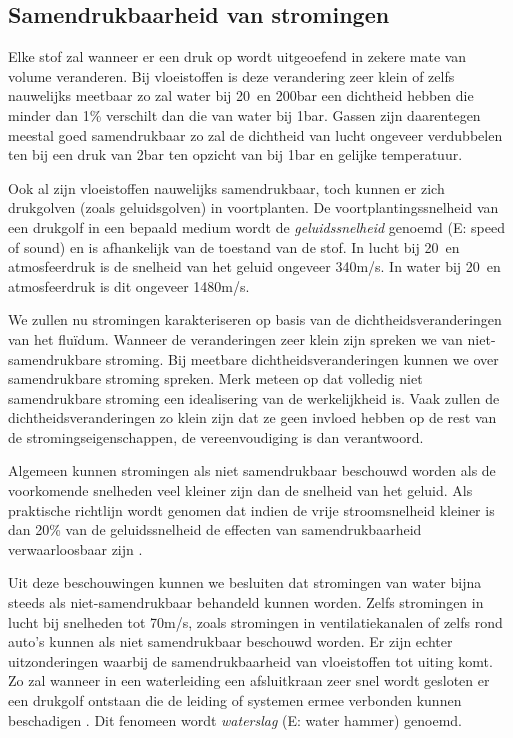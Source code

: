 		\subsection{Samendrukbaarheid van stromingen}
Elke stof zal wanneer er een druk op wordt uitgeoefend in zekere mate van volume veranderen. Bij vloeistoffen is deze verandering zeer klein of zelfs nauwelijks meetbaar zo zal water bij 20\textcelsius\ en 200bar een dichtheid hebben die minder dan 1\% verschilt dan die van water bij 1bar. Gassen zijn daarentegen meestal goed samendrukbaar zo zal de dichtheid van lucht ongeveer verdubbelen ten bij een druk van 2bar ten opzicht van bij 1bar en gelijke temperatuur.

Ook al zijn vloeistoffen nauwelijks samendrukbaar, toch kunnen er zich drukgolven (zoals geluidsgolven) in voortplanten. De voortplantingssnelheid van een drukgolf in een bepaald medium wordt de \emph{geluidssnelheid} genoemd (E: speed of sound) en is afhankelijk van de toestand van de stof. In lucht bij 20\textcelsius\ en atmosfeerdruk is de snelheid van het geluid ongeveer 340m/s. In water bij 20\textcelsius\ en atmosfeerdruk  is dit ongeveer 1480m/s.

We zullen nu stromingen karakteriseren op basis van de dichtheidsveranderingen van het fluïdum. Wanneer de veranderingen zeer klein zijn spreken we van niet-samendrukbare stroming. Bij meetbare dichtheidsveranderingen kunnen we over samendrukbare stroming spreken. Merk meteen op dat volledig niet samendrukbare stroming een idealisering van de werkelijkheid is. Vaak zullen de dichtheidsveranderingen zo klein zijn dat ze geen invloed hebben op de rest van de stromingseigenschappen, de vereenvoudiging is dan verantwoord.

Algemeen kunnen stromingen als niet samendrukbaar beschouwd worden als de voorkomende snelheden veel kleiner zijn dan de snelheid van het geluid. Als praktische richtlijn wordt genomen dat indien de vrije stroomsnelheid kleiner is dan 20\% van de geluidssnelheid de effecten van samendrukbaarheid verwaarloosbaar zijn \cite{Durst2008}.

Uit deze beschouwingen kunnen we besluiten dat stromingen van water bijna steeds als niet-samendrukbaar behandeld kunnen worden. Zelfs stromingen in lucht bij snelheden tot 70m/s, zoals stromingen in ventilatiekanalen of zelfs rond auto's kunnen als niet samendrukbaar beschouwd worden. Er zijn echter uitzonderingen waarbij de samendrukbaarheid van vloeistoffen tot uiting komt. Zo zal wanneer in een waterleiding een afsluitkraan zeer snel wordt gesloten er een drukgolf ontstaan die de leiding of systemen ermee verbonden kunnen beschadigen \cite{Ghidaoui2005}. Dit fenomeen wordt \emph{waterslag} (E: water hammer) genoemd.

